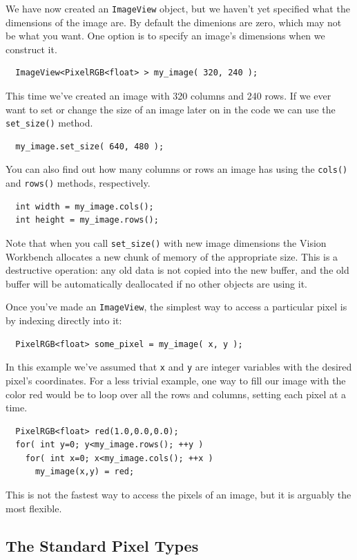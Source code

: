 We have now created an \verb#ImageView# object, but we haven't yet 
specified what the dimensions of the image are.  By default the 
dimenions are zero, which may not be what you want.  One option 
is to specify an image's dimensions when we construct it.
\begin{verbatim}
  ImageView<PixelRGB<float> > my_image( 320, 240 );
\end{verbatim}
This time we've created an image with 320 columns and 240 rows.  If we
ever want to set or change the size of an image later on in the code 
we can use the \verb#set_size()# method.
\begin{verbatim}
  my_image.set_size( 640, 480 );
\end{verbatim}
You can also find out how many columns or rows an image has using the 
\verb#cols()# and \verb#rows()# methods, respectively.
\begin{verbatim}
  int width = my_image.cols();
  int height = my_image.rows();
\end{verbatim}
Note that when you call \verb#set_size()# with new image dimensions
the Vision Workbench allocates a new chunk of memory of the
appropriate size.  This is a destructive operation: any old data is
not copied into the new buffer, and the old buffer will be
automatically deallocated if no other objects are using it.

Once you've made an \verb#ImageView#, the simplest way to access a 
particular pixel is by indexing directly into it:
\begin{verbatim}
  PixelRGB<float> some_pixel = my_image( x, y );
\end{verbatim}
In this example we've assumed that \verb#x# and \verb#y# are integer
variables with the desired pixel's coordinates.  For a less trivial
example, one way to fill our image with the color red would be to loop
over all the rows and columns, setting each pixel at a time.
\begin{verbatim}
  PixelRGB<float> red(1.0,0.0,0.0);
  for( int y=0; y<my_image.rows(); ++y )
    for( int x=0; x<my_image.cols(); ++x )
      my_image(x,y) = red;
\end{verbatim}
This is not the fastest way to access the pixels of an image, but 
it is arguably the most flexible.

\subsection{The Standard Pixel Types}

